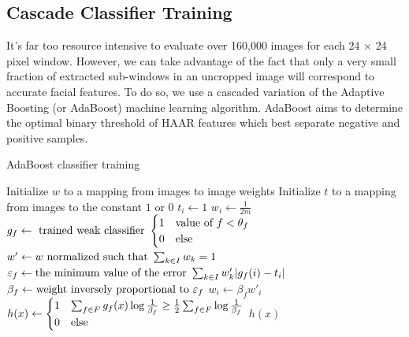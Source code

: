 \documentclass[journal]{IEEEtran}
\begin{document}
\subsection{Cascade Classifier Training}
It's far too resource intensive to evaluate over 160,000 images for each 24 $\times$ 24 pixel window. However, we can take advantage of the fact that only a very small fraction of extracted sub-windows in an uncropped image will correspond to accurate facial features. To do so, we use a cascaded variation of the Adaptive Boosting (or AdaBoost) machine learning algorithm. AdaBoost aims to determine the optimal binary threshold of HAAR features which best separate negative and positive samples.
\begin{algorithm}[]
	\smaller
	\label{adaboost-classifier-algorithm}
	\caption{AdaBoost classifier training}
	
	
	\nl Initialize $w$ to a mapping from images to image weights\;
	\nl Initialize $t$ to a mapping from images to the constant $1$ or $0$\;
	\nl {} {
		\nl {} {
			\nl $t_i \gets 1$\;
			\nl $w_i \gets \frac{1}{2m}$\;
		}
		\nl {}
	}
	\nl {} {
	\nl $g_f \gets \textnormal{ trained weak classifier  } \begin{cases}1 & \textnormal{value of } f < \theta_f \\ 0 & \textnormal{else}\end{cases}$\;
		\nl {} {
			\nl $w' \gets w \textnormal{ normalized such that } \sum_{k \in I} w_k = 1$\;
			\nl $\varepsilon_f \gets \textnormal{the minimum value of the error } \sum_{k \in I} w'_k |g_f(i) - t_i|$\;
			\nl $\beta_f \gets \textnormal{weight inversely proportional to } \varepsilon_f$\;
			\nl $w_i \gets \beta_f w'_i$\;
		}
	}
	\nl $h(x) \gets \begin{cases}1 & \sum_{f \in F} g_f(x) \log{\frac{1}{\beta_f}} \geq \frac{1}{2} \sum_{f \in F} \log{\frac{1}{\beta_f}} \\ 0 & \textnormal{else}\end{cases}$\;
	\nl \Return $h(x)$\;
	\
\end{algorithm}
\end{document}
